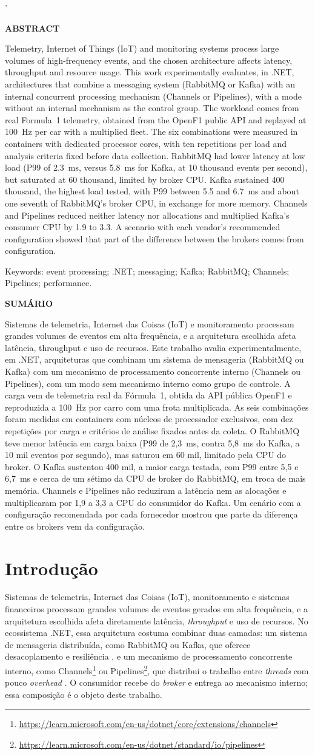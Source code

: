 '\documentclass[12pt]{article}
\newcommand{\textoResumo}{Sistemas de telemetria, Internet das Coisas (IoT) e monitoramento processam grandes volumes de eventos em alta frequência, e a arquitetura escolhida afeta latência, throughput e uso de recursos. Este trabalho avalia experimentalmente, em .NET, arquiteturas que combinam um sistema de mensageria (RabbitMQ ou Kafka) com um mecanismo de processamento concorrente interno (Channels ou Pipelines), com um modo sem mecanismo interno como grupo de controle. A carga vem de telemetria real da Fórmula~1, obtida da API pública OpenF1 e reproduzida a 100~Hz por carro com uma frota multiplicada. As seis combinações foram medidas em containers com núcleos de processador exclusivos, com dez repetições por carga e critérios de análise fixados antes da coleta. O RabbitMQ teve menor latência em carga baixa (P99 de 2,3~ms, contra 5,8~ms do Kafka, a 10 mil eventos por segundo), mas saturou em 60 mil, limitado pela CPU do broker. O Kafka sustentou 400 mil, a maior carga testada, com P99 entre 5,5 e 6,7~ms e cerca de um sétimo da CPU de broker do RabbitMQ, em troca de mais memória. Channels e Pipelines não reduziram a latência nem as alocações e multiplicaram por 1,9 a 3,3 a CPU do consumidor do Kafka. Um cenário com a configuração recomendada por cada fornecedor mostrou que parte da diferença entre os brokers vem da configuração.}
\newcommand{\textoAbstract}{Telemetry, Internet of Things (IoT) and monitoring systems process large volumes of high-frequency events, and the chosen architecture affects latency, throughput and resource usage. This work experimentally evaluates, in .NET, architectures that combine a messaging system (RabbitMQ or Kafka) with an internal concurrent processing mechanism (Channels or Pipelines), with a mode without an internal mechanism as the control group. The workload comes from real Formula~1 telemetry, obtained from the OpenF1 public API and replayed at 100~Hz per car with a multiplied fleet. The six combinations were measured in containers with dedicated processor cores, with ten repetitions per load and analysis criteria fixed before data collection. RabbitMQ had lower latency at low load (P99 of 2.3~ms, versus 5.8~ms for Kafka, at 10 thousand events per second), but saturated at 60 thousand, limited by broker CPU. Kafka sustained 400 thousand, the highest load tested, with P99 between 5.5 and 6.7~ms and about one seventh of RabbitMQ's broker CPU, in exchange for more memory. Channels and Pipelines reduced neither latency nor allocations and multiplied Kafka's consumer CPU by 1.9 to 3.3. A scenario with each vendor's recommended configuration showed that part of the difference between the brokers comes from configuration.}
\renewcommand{\contentsname}{SUMÁRIO}
\begin{document}
\newpage
\pagestyle{empty}

\centering
{\textbf{ABSTRACT} \par}
\vspace{1cm}
\justifying
\noindent
\textoAbstract

\noindent
Keywords: event processing; .NET; messaging; Kafka; RabbitMQ; Channels; Pipelines; performance.

\newpage
\pagestyle{empty}

\centering
{\textbf{SUMÁRIO} \par}
\justifying

\renewcommand{\contentsname}{}
\tableofcontents

\maketitle

\begin{abstract}
\textoAbstract
\end{abstract}

\begin{resumo}
\textoResumo
\end{resumo}


\section{Introdução}

Sistemas de telemetria, Internet das Coisas (IoT), monitoramento e sistemas financeiros
processam grandes volumes de eventos gerados em alta frequência, e a arquitetura escolhida
afeta diretamente latência, \textit{throughput} e uso de recursos. No ecossistema .NET, essa
arquitetura costuma combinar duas camadas: um sistema de mensageria distribuída, como
RabbitMQ ou Kafka, que oferece desacoplamento e resiliência \cite{dobbelaere:2017}, e um
mecanismo de processamento concorrente interno, como
Channels\footnote{\url{https://learn.microsoft.com/en-us/dotnet/core/extensions/channels}}
ou
Pipelines\footnote{\url{https://learn.microsoft.com/en-us/dotnet/standard/io/pipelines}},
que distribui o trabalho entre \textit{threads} com pouco \textit{overhead} \cite{cleary:2019}. O
consumidor recebe do \textit{broker} e entrega ao mecanismo interno; essa composição é o objeto
deste trabalho.
\end{document}
